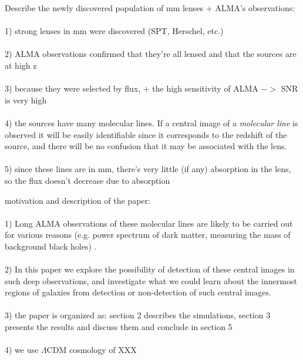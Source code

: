 \documentclass[chicago]{emulateapj}
\begin{document}
\begin{framed}
Describe the newly discovered population of mm lenses + ALMA's observations: \\  \\
1) strong lenses in mm were discovered (SPT, Herschel, etc.) \\ \\
2) ALMA observations confirmed that they're all lensed and that the sources are at high z \\ \\
3) because they were selected by flux, + the high sensitivity of ALMA $->$ SNR is very high \\ \\
4) the sources have many molecular lines. If a central image of a \emph{molecular line} is observed it will be easily identifiable since it corresponds to the redshift of the source, and there will be no confusion that it may be associated with the lens. \\ \\
5) since these lines are in mm, there's very little (if any) absorption in the lens, so the flux doesn't decrease due to absorption
\end{framed}

\begin{framed}
motivation and description of the paper: \\ \\
1) Long ALMA observations of these molecular lines are likely to be carried out for various reasons (e.g. power spectrum of dark matter, measuring the mass of background black holes) .  \\ \\
2) In this paper we explore the possibility of detection of these central images in such deep observations, and investigate what we could learn about the innermost regions of galaxies from detection or non-detection of such central images.\\ \\
3) the paper is organized as: section 2 describes the simulations, section 3 presents the results and discuss them and conclude in section 5 \\ \\
4) we use $\Lambda$CDM cosmology of XXX
\end{framed}
\end{document}
